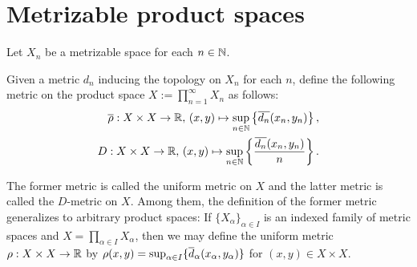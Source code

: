\section{Metrizable product spaces}

Let $X_n$ be a metrizable space for each $n\in{\mathbb{N}}$.

\begin{nota}
    Given a metric $d_n$ inducing the topology on $X_n$ for each $n$,
    define the following metric on the product space $X:=\prod_{n=1}^\infty X_n$ as follows:
    \begin{align*}
        \overline{\rho}: X\times X\rightarrow{\mathbb{R}},\,(x, y)\mapsto\sup_{n\in{\mathbb{N}}}\left\{\overline{d_n}(x_n, y_n)\right\},\\
        D: X\times X\rightarrow{\mathbb{R}},\,(x, y)\mapsto\sup_{n\in{\mathbb{N}}}\left\{\frac{\overline{d_n}(x_n, y_n)}{n}\right\}.
    \end{align*}
\end{nota}
The former metric is called the uniform metric on $X$ and the latter metric is called the $D$-metric on $X$.
Among them, the definition of the former metric generalizes to arbitrary product spaces: If $\{X_\alpha\}_{\alpha\in I}$ is an indexed family of metric spaces and $X=\prod_{\alpha\in I} X_\alpha$, then we may define the uniform metric $\rho: X\times X\rightarrow {\mathbb{R}}$ by $\rho(x, y)=\sup_{\alpha\in I}\{\overline{d}_\alpha(x_\alpha, y_\alpha)\}$ for $(x, y)\in X\times X$.

